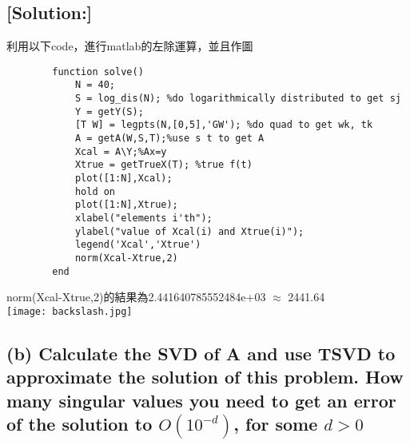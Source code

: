 \documentclass[12pt]{article}
\begin{document}
    \subsection*{[Solution:]}
    利用以下code，進行matlab的左除運算，並且作圖
    \begin{lstlisting}
        function solve()
            N = 40;
            S = log_dis(N); %do logarithmically distributed to get sj
            Y = getY(S);
            [T W] = legpts(N,[0,5],'GW'); %do quad to get wk, tk
            A = getA(W,S,T);%use s t to get A
            Xcal = A\Y;%Ax=y
            Xtrue = getTrueX(T); %true f(t)
            plot([1:N],Xcal);
            hold on
            plot([1:N],Xtrue);
            xlabel("elements i'th");
            ylabel("value of Xcal(i) and Xtrue(i)");
            legend('Xcal','Xtrue')
            norm(Xcal-Xtrue,2)
        end
    \end{lstlisting}
    norm(Xcal-Xtrue,2)的結果為2.441640785552484e+03 $\approx$ 2441.64\\
    \texttt{[image: backslash.jpg]}

    \subsection*{(b) Calculate the SVD of A and use TSVD to approximate the solution of this
        problem. How many singular values you need to get an error of the solution to
        $O(10^{-d})$, for some $d > 0$}
\end{document}
